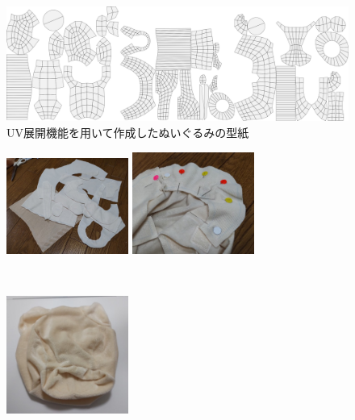 \documentclass[uplatex,a4paper,12pt]{jsarticle}
\begin{document}
\begin{figure}[htbp]
  \centering
  \includegraphics[width=12cm]{images/mohukawa/uv.png}
  \caption{UV展開機能を用いて作成したぬいぐるみの型紙}
  \label{fig:mohukawa:uv}
\end{figure}

\begin{figure}[htbp]
  \centering
  \begin{minipage}[c]{0.48\linewidth}
    \centering
    \includegraphics[keepaspectratio,width=4cm,clip]{images/mohukawa/saw_01.jpg}
  \end{minipage}
  \begin{minipage}[c]{0.48\linewidth}
    \centering
    \includegraphics[keepaspectratio,width=4cm,clip]{images/mohukawa/saw_02.jpg}
  \end{minipage} \\
  \begin{minipage}[c]{0.48\linewidth}
    \centering
    \includegraphics[keepaspectratio,width=4cm,clip]{images/mohukawa/saw_03.jpg}

\end{minipage}
\end{figure}
\end{document}

